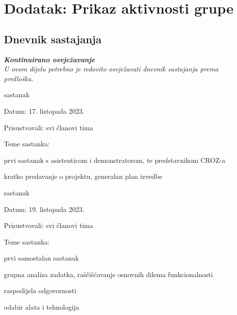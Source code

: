 \chapter*{Dodatak: Prikaz aktivnosti grupe}
		
		\section*{Dnevnik sastajanja}
		
		\textbf{\textit{Kontinuirano osvježavanje}}\\
		
		 \textit{U ovom dijelu potrebno je redovito osvježavati dnevnik sastajanja prema predlošku.}
		
		\begin{packed_enum}
			\item  sastanak
			
			\item[] \begin{packed_item}
				\item Datum: 17. listopada 2023.
				\item Prisustvovali: svi članovi tima
				\item Teme sastanka:
				\begin{packed_item}
					\item  prvi sastanak s asistenticom i demonstratorom, te predstavnikom CROZ-a
					\item  kratko predavanje o projektu, generalan plan izvedbe
				\end{packed_item}
			\end{packed_item}
			
			\item  sastanak
			\item[] \begin{packed_item}
				\item Datum: 19. listopada 2023.
				\item Prisustvovali: svi članovi tima
				\item Teme sastanka:
				\begin{packed_item}
					\item  prvi samostalan sastanak
					\item  grupna analiza zadatka, raščišćavanje osnovnih dilema funkcionalnosti
					\item  raspodijela odgovornosti
					\item  odabir alata i tehnologija
				\end{packed_item}
			\end{packed_item}
			

\end{packed_enum}

